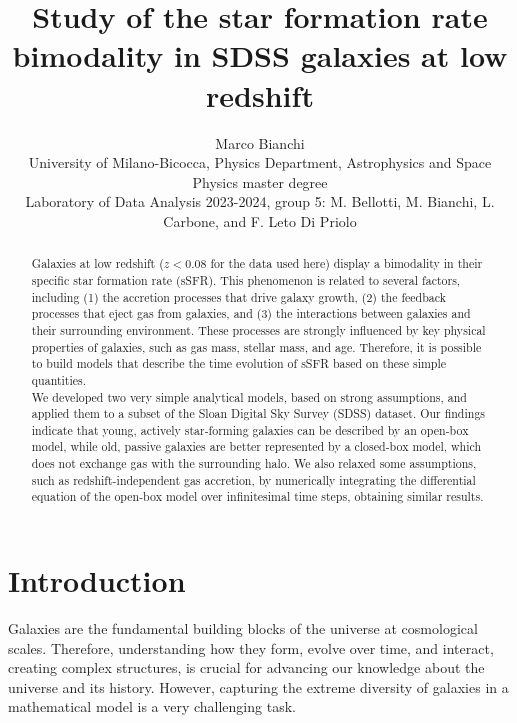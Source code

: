 \documentclass[fleqn,usenatbib]{mnras}
\title[]{Study of the star formation rate bimodality in SDSS galaxies at low redshift}
\author[Marco Bianchi]{
Marco Bianchi
\\
University of Milano-Bicocca, Physics Department, Astrophysics and Space Physics master degree\\
Laboratory of Data Analysis 2023-2024, group 5: M. Bellotti, M. Bianchi, L. Carbone, and F. Leto Di Priolo
}
\begin{document}
\label{firstpage}
\pagerange{\pageref{firstpage}--\pageref{lastpage}}
\maketitle

\begin{abstract}
Galaxies at low redshift ($z<0.08$ for the data used here) display a bimodality in their specific star formation rate (sSFR). This phenomenon is related to several factors, including (1) the accretion processes that drive galaxy growth, (2) the feedback processes that eject gas from galaxies, and (3) the interactions between galaxies and their surrounding environment. These processes are strongly influenced by key physical properties of galaxies, such as gas mass, stellar mass, and age. Therefore, it is possible to build models that describe the time evolution of sSFR based on these simple quantities. \\
We developed two very simple analytical models, based on strong assumptions, and applied them to a subset of the Sloan Digital Sky Survey (SDSS) dataset. Our findings indicate that young, actively star-forming galaxies can be described by an open-box model, while old, passive galaxies are better represented by a closed-box model, which does not exchange gas with the surrounding halo. We also relaxed some assumptions, such as redshift-independent gas accretion, by numerically integrating the differential equation of the open-box model over infinitesimal time steps, obtaining similar results.
\smallskip
\end{abstract} 





\section{Introduction}\label{sec:introduction}
Galaxies are the fundamental building blocks of the universe at cosmological scales. Therefore, understanding how they form, evolve over time, and interact, creating complex structures, is crucial for advancing our knowledge about the universe and its history. However, capturing the extreme diversity of galaxies in a mathematical model is a very challenging task.
\end{document}
